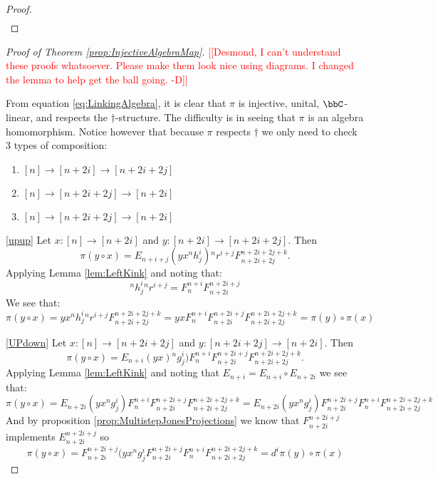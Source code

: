 \documentclass[11pt]{article}
\theoremstyle{plain}
\theoremstyle{definition}
\newcommand{\des}[1]{\marginpar{\tiny \textcolor{purple}{DJC: #1}}}
\newcommand{\nn}[1]{\textcolor{red}{[[#1]]}}
\begin{document}
\begin{proof}
\begin{align*}
\end{align*}
\end{proof}

\begin{proof}[Proof of Theorem \ref{prop:InjectiveAlgebraMap}]
\nn{Desmond, I can't understand these proofs whatsoever. 
Please make them look nice using diagrams.
I changed the lemma to help get the ball going.
-D}

From equation \ref{eq:LinkingAlgebra}, it is clear that $\pi$ is injective, unital, $\bbC$-linear, and respects the $\dag$-structure. The difficulty is in seeing that $\pi$ is an algebra homomorphism. 
Notice however that because $\pi$ respects $\dag$ we only need to check 3 types of composition:
\begin{enumerate}
	\item
		\label{upup}  
		$[n]\rightarrow [n+2i]\rightarrow [n+2i+2j] $
	\item
		\label{UPdown} 
		$[n]\rightarrow [n+2i+2j] \rightarrow [n+2i] $
	\item
		\label{downUP} 
		$[n]\rightarrow [n+2i+2j] \rightarrow [n+2i]$
\end{enumerate}

\eqref{upup}
Let $x:[n]\rightarrow [n+2i]$ and $y:[n+2i]\rightarrow [n+2i+2j]$. 
Then 
$$
\pi(y\circ x)=E_{n+i+j}(yx{}^nh^i_j){}^n r^{i+j}F^{n+2i+2j+k}_{n+2i+2j}.
$$ 
Applying Lemma \ref{lem:LeftKink} and noting that: 
$$
{}^nh^i_j{}^n r^{i+j}=F^{n+i}_{n}F^{n+2i+j}_{n+2i}
$$ 
We see that: 
$$
\pi(y\circ x)=yx{}^nh^i_j{}^n r^{i+j}F^{n+2i+2j+k}_{n+2i+2j}= yxF^{n+i}_{n}F^{n+2i+j}_{n+2i}F^{n+2i+2j+k}_{n+2i+2j}=\pi(y)\circ \pi(x)
$$
 
\eqref{UPdown} 
Let $x:[n]\rightarrow [n+2i+2j]$ and $y:[n+2i+2j]\rightarrow [n+2i]$. 
Then 
$$
\pi(y\circ x)=E_{n+i}(yx){}^ng^i_j)F^{n+i}_{n}F^{n+2i+j}_{n+2i}F^{n+2i+2j+k}_{n+2i+2j}.
$$ 
Applying Lemma \ref{lem:LeftKink} and noting that $E_{n+i}=E_{n+i}\circ E_{n+2i}$ we see that:
$$
\pi(y\circ x)= E_{n+2i}(yx{}^ng^i_j)F^{n+i}_{n}F^{n+2i+j}_{n+2i}F^{n+2i+2j+k}_{n+2i+2j}=E_{n+2i}(yx{}^ng^i_j)F^{n+2i+j}_{n+2i}F^{n+i}_{n}F^{n+2i+2j+k}_{n+2i+2j}
$$
And by proposition \ref{prop:MultistepJonesProjections} we know that $F^{n+2i+j}_{n+2i}$ implements $E_{n+2i}^{n+2i+j}$ so
$$
\pi(y\circ x)= F^{n+2i+j}_{n+2i}(yx{}^ng^i_jF^{n+2i+j}_{n+2i}F^{n+i}_{n}F^{n+2i+2j+k}_{n+2i+2j}=d^i \pi(y) \circ \pi(x)
$$


\end{proof}
\end{document}
